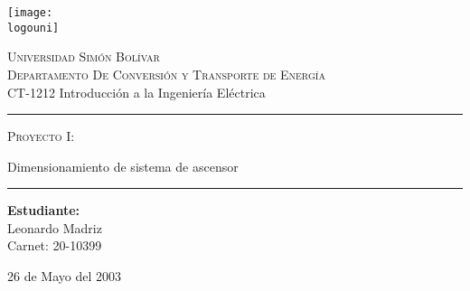 \documentclass[a4paper]{article} %
\newcommand{\logouni}{Imagenes/Logo.png}
\newcommand{\startDate}{26 de Mayo del 2003}
\begin{document}
	\begin{titlepage}
		\centering
		\texttt{[image: \\logouni]}\par\vspace{0.2cm}
		{\scshape\LARGE Universidad Simón Bolívar}\vspace{0.2cm}\\
		{\scshape \large Departamento De Conversión y Transporte de Energía}\vspace{0.2cm}\\
		{\large CT-1212 Introducción a la Ingeniería Eléctrica}\par
		\vfill
		\centering
		\rule{\linewidth}{0.75mm}
		{\scshape \LARGE Proyecto I:\par \vspace{0.2cm} Dimensionamiento de sistema de ascensor}
		\rule{\linewidth}{0.75mm}
		\vfill

		\begin{center}
			{\large \textbf{Estudiante:}\\Leonardo Madriz\\ Carnet:  20-10399}
		\end{center}
		\vfill
	{\huge\startDate \par}
	\end{titlepage}
\end{document}
